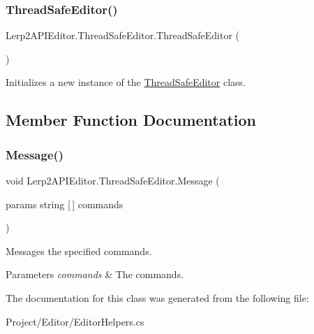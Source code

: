 \subsubsection{\texorpdfstring{Thread\+Safe\+Editor()}{ThreadSafeEditor()}}
{\footnotesize\ttfamily Lerp2\+A\+P\+I\+Editor.\+Thread\+Safe\+Editor.\+Thread\+Safe\+Editor (\begin{DoxyParamCaption}{ }\end{DoxyParamCaption})\hspace{0.3cm}{\ttfamily [inline]}}



Initializes a new instance of the \hyperlink{class_lerp2_a_p_i_editor_1_1_thread_safe_editor}{Thread\+Safe\+Editor} class. 



\subsection{Member Function Documentation}
\mbox{\label{class_lerp2_a_p_i_editor_1_1_thread_safe_editor_a3e1b599ef5271b01d0ff5ef2a66dc83b}} 
\subsubsection{\texorpdfstring{Message()}{Message()}}
{\footnotesize\ttfamily void Lerp2\+A\+P\+I\+Editor.\+Thread\+Safe\+Editor.\+Message (\begin{DoxyParamCaption}\item[{params string \mbox{[}$\,$\mbox{]}}]{commands }\end{DoxyParamCaption})\hspace{0.3cm}{\ttfamily [inline]}}



Messages the specified commands. 


\begin{DoxyParams}{Parameters}
{\em commands} & The commands.\\
\hline
\end{DoxyParams}


The documentation for this class was generated from the following file\+:\begin{DoxyCompactItemize}
\item 
Project/\+Editor/Editor\+Helpers.\+cs\end{DoxyCompactItemize}
